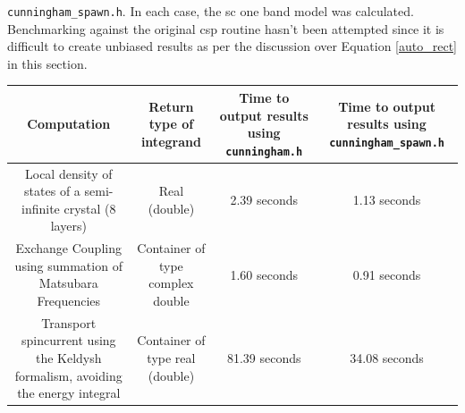 \documentclass[a4paper, 12pt]{article}
\begin{document}
{\tt cunningham\_spawn.h}. In each case, the \gls{sc} one band model was calculated. Benchmarking against the original \gls{csp} routine hasn't been attempted since it is difficult to create unbiased results as per the discussion over Equation \eqref{auto_rect} in this section.
\footnotesize
\begin{center}
\begin{tabular}{cccc}\toprule
	Computation& \parbox{3cm}{\centering Return type of integrand}& \parbox{3cm}{\centering Time to output results using {\scriptsize\tt cunningham.h}}& \parbox{3cm}{\centering Time to output results using {\scriptsize\tt cunningham\_spawn.h}}\\
\midrule
\parbox{3cm}{\centering Local density of states of a semi-infinite crystal (8 layers)}& Real (double)& 2.39 seconds& 1.13 seconds\\[1cm]
\parbox{3cm}{\centering Exchange Coupling using summation of Matsubara Frequencies}& \parbox{3cm}{\centering Container of type complex double}& 1.60 seconds& 0.91 seconds\\[1cm]
\parbox{3cm}{\centering Transport spincurrent using the Keldysh formalism, avoiding the energy integral}& \parbox{3cm}{\centering Container of type real (double)}& 81.39 seconds& 34.08 seconds\\
\bottomrule
\end{tabular}
\end{center}

\normalsize
\begingroup
\let\clearpage\relax


\endgroup
\end{document}
